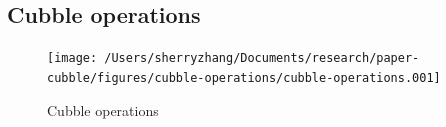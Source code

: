 \documentclass[
]{jss}
\begin{document}
\newpage

\hypertarget{cubble-operations}{%
\subsection{Cubble operations}\label{cubble-operations}}

\begin{CodeChunk}
\begin{figure}

{\centering \texttt{[image: /Users/sherryzhang/Documents/research/paper-cubble/figures/cubble-operations/cubble-operations.001]} 

}

\caption[Cubble operations]{Cubble operations}\label{fig:cubble-operations}
\end{figure}
\end{CodeChunk}


\end{document}
